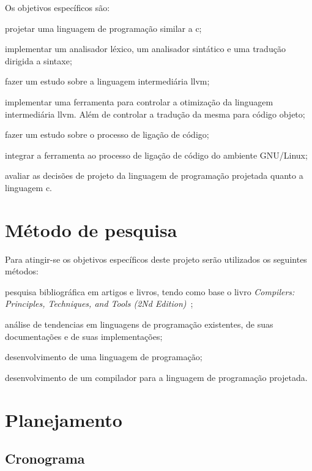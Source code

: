 \documentclass[
  12pt,
  openright,
  twoside,
  a4paper,
  english,
  brazil
]{abntex2}
\begin{document}
Os objetivos específicos são:
\begin{alineas}
  \item projetar uma linguagem de programação similar a c;
  \item implementar um analisador léxico, um analisador sintático e uma tradução dirigida a sintaxe;
  \item fazer um estudo sobre a linguagem intermediária llvm;
  \item implementar uma ferramenta para controlar a otimização da linguagem intermediária llvm. Além de controlar a tradução da mesma para código objeto;
  \item fazer um estudo sobre o processo de ligação de código;
  \item integrar a ferramenta ao processo de ligação de código do ambiente GNU/Linux;
  \item avaliar as decisões de projeto da linguagem de programação projetada quanto a linguagem c.
\end{alineas}

\chapter{Método de pesquisa}\label{cap:metodo_de_pesquisa}

Para atingir-se os objetivos específicos deste projeto serão utilizados os seguintes métodos:
\begin{alineas}
  \item pesquisa bibliográfica em artigos e livros, tendo como base o livro \textit{Compilers: Principles, Techniques, and Tools (2Nd Edition)}~\cite{Aho:2006:CPT:1177220};
  \item análise de tendencias em linguagens de programação existentes, de suas documentações e de suas implementações;
  \item desenvolvimento de uma linguagem de programação;
  \item desenvolvimento de um compilador para a linguagem de programação projetada.
\end{alineas}

\chapter{Planejamento}

\section{Cronograma}\label{cap:cronograma}
\end{document}
